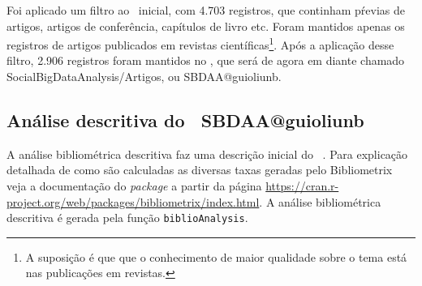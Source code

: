 Foi aplicado um filtro ao \dataset\ inicial, com 4.703 registros, que continham pŕevias de artigos, artigos de conferência, capítulos de livro etc. Foram mantidos apenas os registros de artigos publicados em revistas científicas\footnote{A suposição é que que o conhecimento de maior qualidade sobre o tema está nas publicações em revistas.}. Após a aplicação desse filtro, 2.906 registros foram mantidos no \dataset, que será de agora em diante chamado SocialBigDataAnalysis/Artigos, ou SBDAA@guioliunb.

\subsection{Análise descritiva do \dataset\   SBDAA@guioliunb}

A análise bibliométrica descritiva faz uma descrição inicial do \dataset\  . Para explicação detalhada de como são calculadas as diversas taxas geradas pelo Bibliometrix veja a documentação do \textit{package} a partir da página \url{https://cran.r-project.org/web/packages/bibliometrix/index.html}. A análise bibliométrica descritiva é gerada pela função \texttt{biblioAnalysis}.

